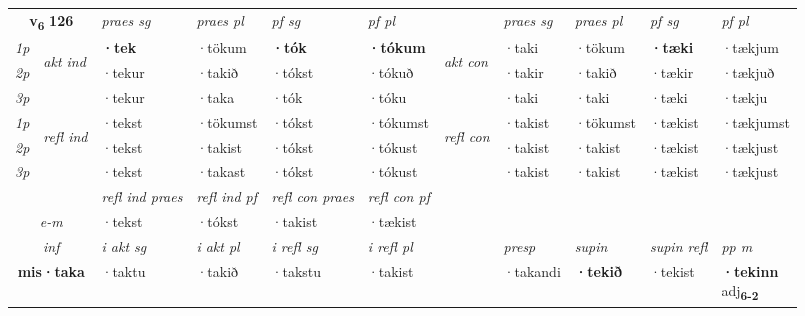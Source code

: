 \noindent
\begin{tabular}{lllllllllll} \toprule
\multicolumn{2}{c}{\textbf{v{\textsubscript{6}}} \Large{\textbf{126}}}  &  \textit{praes sg}  & \textit{praes pl}  &\textit{ pf sg} & \textit{pf pl} &  &  \textit{praes sg}  & \textit{praes pl}  & \textit{pf sg} & \textit{pf pl } \\*
	\cmidrule{3-6} \cmidrule{8-11}
 {\textit{1p}} & \multirow{3}{*}{\begin{turn}{90}\textit{akt ind}\end{turn}} & \textbf{·tek} & ·tökum & \textbf{·tók} & \textbf{·tókum} & \multirow{3}{*}{\begin{turn}{90}\textit{akt con}\end{turn}} &·taki & ·tökum & \textbf{·tæki} & ·tækjum\\*
 {\textit{2p}} &  &  ·tekur  & ·takið & ·tókst & ·tókuð & & ·takir & ·takið & ·tækir & ·tækjuð \\*
{\textit{3p}} &  & ·tekur & ·taka & ·tók & ·tóku & & ·taki & ·taki& ·tæki & ·tækju \\*
\cmidrule{3-6} \cmidrule{8-11}
 {\textit{1p}} & \multirow{3}{*}{\begin{turn}{90}\textit{refl ind}\end{turn}}  & ·tekst & ·tökumst & ·tókst & ·tókumst & \multirow{3}{*}{\begin{turn}{90}\textit{refl con}\end{turn}}  &·takist & ·tökumst & ·tækist & ·tækjumst \\*
 {\textit{2p}} &  & ·tekst & ·takist & ·tókst & ·tókust & &·takist & ·takist & ·tækist & ·tækjust \\*
 {\textit{3p}}  & & ·tekst & ·takast & ·tókst & ·tókust & & ·takist & ·takist& ·tækist & ·tækjust \\*
\cmidrule{3-6} \cmidrule{8-11}

 & & \textit{refl ind praes} & \textit{refl ind pf} & \textit{refl con praes} & \textit{refl con pf} \\*
 \multicolumn{2}{c}{ \textit{e-m} }& ·tekst & ·tókst & ·takist & ·tækist \\*

\cmidrule{3-11}
   \multicolumn{2}{c}{\textit{inf}}  & \textit{i akt sg} & \textit{i akt pl} & \textit{i refl sg} & \textit{i refl pl} && \textit{presp} & \textit{supin} & \textit{supin refl} & \textit{pp m} \\*
  \multicolumn{2}{c}{\textbf{mis\allowbreak ·taka}} & ·taktu  & ·takið & ·takstu & ·takist && ·takandi &  \textbf{·tekið} & ·tekist & \specialcell{\textbf{·tekinn} \\ adj\textbf{\textsubscript{6-2}}} \\*
\end{tabular}

